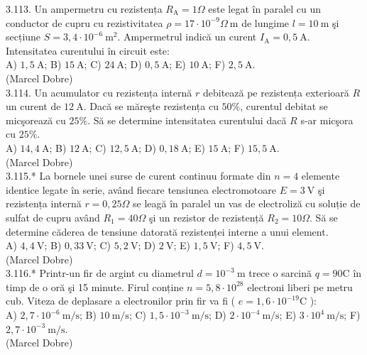 3.113. Un ampermetru cu rezistența $R_{\mathrm{A}}=1 \Omega$ este legat în paralel cu un conductor de cupru cu rezistivitatea $\rho=17 \cdot 10^{-9} \Omega \mathrm{~m}$ de lungime $l=10 \mathrm{~m}$ şi secțiune $S=3,4 \cdot 10^{-6} \mathrm{~m}^{2}$. Ampermetrul indică un curent $I_{\mathrm{A}}=0,5 \mathrm{~A}$. Intensitatea curentului în circuit este:\\ A) $1,5 \mathrm{~A}$; B) $15 \mathrm{~A}$; C) $24 \mathrm{~A}$; D) $0,5 \mathrm{~A}$; E) $10 \mathrm{~A}$; F) $2,5 \mathrm{~A}$.\\ (Marcel Dobre)\\

3.114. Un acumulator cu rezistența internă $r$ debitează pe rezistența exterioară $R$ un curent de $12 \mathrm{~A}$. Dacă se măreşte rezistența cu $50 \%$, curentul debitat se micşorează cu $25 \%$. Să se determine intensitatea curentului dacă $R$ s-ar micşora cu $25 \%$.\\ A) $14,4 \mathrm{~A}$; B) $12 \mathrm{~A}$; C) $12,5 \mathrm{~A}$; D) $0,18 \mathrm{~A}$; E) $15 \mathrm{~A}$; F) $15,5 \mathrm{~A}$.\\ (Marcel Dobre)\\

3.115.* La bornele unei surse de curent continuu formate din $n=4$ elemente identice legate în serie, având fiecare tensiunea electromotoare $E=3 \mathrm{~V}$ şi rezistența internă $r=0,25 \Omega$ se leagă în paralel un vas de electroliză cu soluție de sulfat de cupru având $R_{1}=40 \Omega$ şi un rezistor de rezistență $R_{2}=10 \Omega$. Să se determine căderea de tensiune datorată rezistenței interne a unui element.\\ A) $4,4 \mathrm{~V}$; B) $0,33 \mathrm{~V}$; C) $5,2 \mathrm{~V}$; D) $2 \mathrm{~V}$; E) $1,5 \mathrm{~V}$; F) $4,5 \mathrm{~V}$.\\ (Marcel Dobre)\\

3.116.* Printr-un fir de argint cu diametrul $d=10^{-3} \mathrm{~m}$ trece o sarcină $q=90 \mathrm{C}$ în timp de o oră şi 15 minute. Firul conține $n=5,8 \cdot 10^{28}$ electroni liberi pe metru cub. Viteza de deplasare a electronilor prin fir va fi ( $e=1,6 \cdot 10^{-19} \mathrm{C}$ ):\\ A) $2,7 \cdot 10^{-6} \mathrm{~m} / \mathrm{s}$; B) $10 \mathrm{~m} / \mathrm{s}$; C) $1,5 \cdot 10^{-3} \mathrm{~m} / \mathrm{s}$; D) $2 \cdot 10^{-4} \mathrm{~m} / \mathrm{s}$; E) $3 \cdot 10^{4} \mathrm{~m} / \mathrm{s}$; F) $2,7 \cdot 10^{-3} \mathrm{~m} / \mathrm{s}$.\\ (Marcel Dobre)\\

